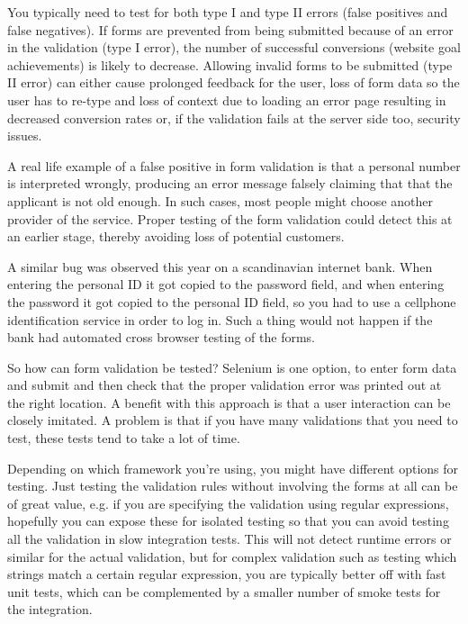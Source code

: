 \documentclass[11pt]{article}
\begin{document}
You typically need to test for both type I and type II errors (false positives and false negatives). If forms are prevented from being submitted because of an error in the validation (type I error), the number of successful conversions (website goal achievements) is likely to decrease. Allowing invalid forms to be submitted (type II error) can either cause prolonged feedback for the user, loss of form data so the user has to re-type and loss of context due to loading an error page resulting in decreased conversion rates or, if the validation fails at the server side too, security issues.

A real life example of a false positive in form validation is that a personal number is interpreted wrongly, producing an error message falsely claiming that that the applicant is not old enough. In such cases, most people might choose another provider of the service. Proper testing of the form validation could detect this at an earlier stage, thereby avoiding loss of potential customers. \cite{TwitterMe}

A similar bug was observed this year on a scandinavian internet bank. When entering the personal ID it got copied to the password field, and when entering the password it got copied to the personal ID field, so you had to use a cellphone identification service in order to log in. Such a thing would not happen if the bank had automated cross browser testing of the forms. \cite[question~38]{Ahnve}

So how can form validation be tested? Selenium is one option, to enter form data and submit and then check that the proper validation error was printed out at the right location. A benefit with this approach is that a user interaction can be closely imitated. A problem is that if you have many validations that you need to test, these tests tend to take a lot of time.

Depending on which framework you're using, you might have different options for testing. Just testing the validation rules without involving the forms at all can be of great value, e.g. if you are specifying the validation using regular expressions, hopefully you can expose these for isolated testing so that you can avoid testing all the validation in slow integration tests. This will not detect runtime errors or similar for the actual validation, but for complex validation such as testing which strings match a certain regular expression, you are typically better off with fast unit tests, which can be complemented by a smaller number of smoke tests for the integration.
\end{document}
